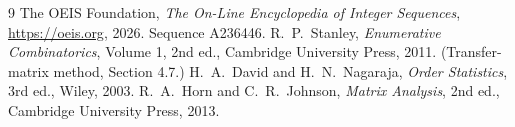 \documentclass[11pt,a4paper]{article}
\theoremstyle{plain}
\theoremstyle{definition}
\begin{document}
\begin{thebibliography}{9}
 The OEIS Foundation, \emph{The On-Line Encyclopedia of Integer
Sequences}, \url{https://oeis.org}, 2026. Sequence A236446.
 R.~P.~Stanley, \emph{Enumerative Combinatorics}, Volume 1, 2nd ed.,
Cambridge University Press, 2011. (Transfer-matrix method, Section 4.7.)
 H.~A.~David and H.~N.~Nagaraja, \emph{Order Statistics}, 3rd ed., Wiley,
2003.
 R.~A.~Horn and C.~R.~Johnson, \emph{Matrix Analysis}, 2nd ed., Cambridge
University Press, 2013.
\end{thebibliography}
\end{document}
